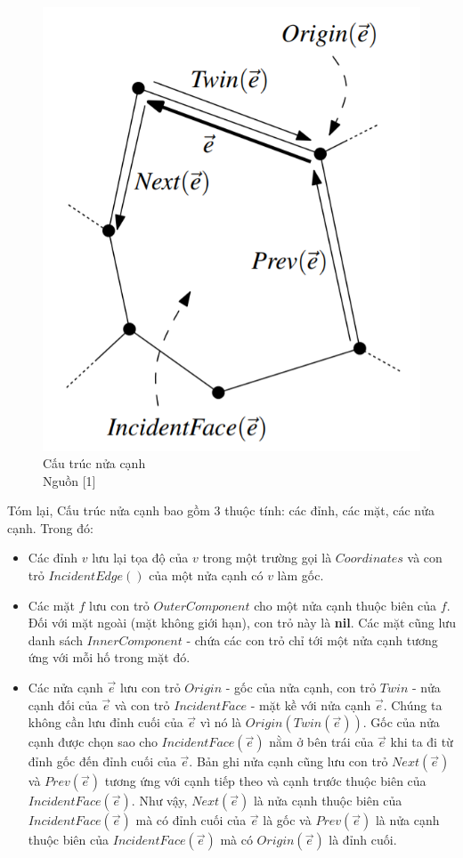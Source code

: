 \documentclass[15pt]{article}
\begin{document}
{\begin{figure}[h!]
\centering
\includegraphics[scale=0.38]{./dcel1.png}
\caption{Cấu trúc nửa cạnh \\ Nguồn [1]}
\label{fig: cấu trức nửa cạnh}
\end{figure}
Tóm lại, Cấu trúc nửa cạnh bao gồm 3 thuộc tính: các đỉnh, các mặt, các nửa cạnh. Trong đó:
\begin{itemize}
    \item Các đỉnh $v$ lưu lại tọa độ của $v$ trong một trường gọi là $Coordinates$ và con trỏ $IncidentEdge()$ của một nửa cạnh có $v$ làm gốc.
    \item Các mặt $f$ lưu con trỏ $OuterComponent$ cho một  nửa cạnh thuộc biên của $f$. Đối với mặt ngoài (mặt không giới hạn), con trỏ này là \textbf{nil}. Các mặt cũng lưu danh sách $InnerComponent$ - chứa các con trỏ chỉ tới một nửa cạnh tương ứng với mỗi hố trong mặt đó.
    \item Các nửa cạnh $\vec{e}$ lưu con trỏ $Origin$ - gốc của nửa cạnh, con trỏ $Twin$ - nửa cạnh đối của $\vec{e}$ và con trỏ $IncidentFace$ - mặt kề với nửa cạnh $\vec{e}$. Chúng ta không cần lưu đỉnh cuối của $\vec{e}$ vì nó là $Origin(Twin(\vec{e}))$. Gốc của nửa cạnh được chọn sao cho $IncidentFace(\vec{e})$ nằm ở bên trái của $\vec{e}$ khi ta đi từ đỉnh gốc đến đỉnh cuối của $\vec{e}$. Bản ghi nửa cạnh cũng lưu con trỏ $Next(\vec{e})$ và $Prev(\vec{e})$ tương ứng với cạnh tiếp theo và cạnh trước thuộc biên của $IncidentFace(\vec{e})$. Như vậy, $Next(\vec{e})$ là nửa cạnh thuộc biên của  $IncidentFace(\vec{e})$ mà có đỉnh cuối của $\vec{e}$ là gốc và $Prev(\vec{e})$ là nửa cạnh thuộc biên của $IncidentFace(\vec{e})$ mà có $Origin(\vec{e})$ là đỉnh cuối.

\end{itemize}}
\end{document}
